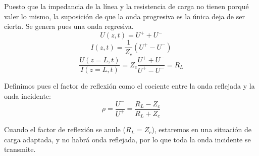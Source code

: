 \documentclass[12pt]{article}
\begin{document}
Puesto que la impedancia de la l\'inea y la resistencia de carga no tienen porqu\'e valer lo mismo, la suposici\'on de que la onda progresiva es la \'unica deja de ser cierta. Se genera pues una onda regresiva.
	$$U(z, t) = U^+ + U^-$$
	$$I(z, t) = \frac{1}{Z_c}(U^+ - U^-)$$
	$$\frac{U(z = L, t)}{I(z = L, t)} = Z_c\frac{U^++U^-}{U^+-U^-} = R_L$$

Definimos pues el factor de reflexi\'on como el cociente entre la onda reflejada y la onda incidente:
$$\rho = \frac{U^-}{U^+} = \frac{R_L-Z_c}{R_L+Z_c}$$

Cuando el factor de reflexi\'on se anule ($R_L=Z_c$), estaremos en una situaci\'on de carga adaptada, y no habr\'a onda reflejada, por lo que toda la onda incidente se transmite.
\end{document}
